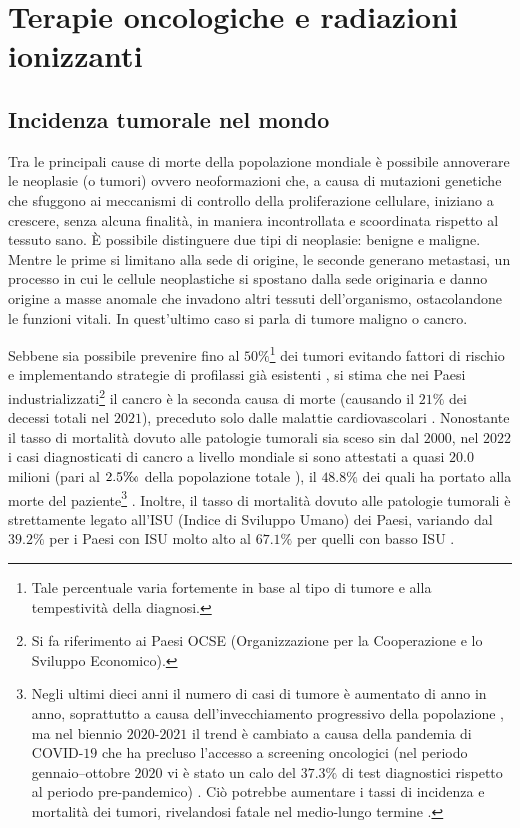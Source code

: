 \documentclass[12pt,a4paper,twoside]{report}
\begin{document}
	\chapter{Terapie oncologiche e radiazioni ionizzanti}\label{cap:1}
	\section{Incidenza tumorale nel mondo}\label{sec:1.1}
	Tra le principali cause di morte della popolazione mondiale è possibile annoverare le neoplasie (o tumori) ovvero neoformazioni che, a causa di mutazioni genetiche che sfuggono ai meccanismi di controllo della proliferazione cellulare, iniziano a crescere, senza alcuna finalità, in maniera incontrollata e scoordinata rispetto al tessuto sano. \`E possibile distinguere due tipi di neoplasie: benigne e maligne. Mentre le prime si limitano alla sede di origine, le seconde generano metastasi, un processo in cui le cellule neoplastiche si spostano dalla sede originaria e danno origine a masse anomale che invadono altri tessuti dell'organismo, ostacolandone le funzioni vitali. In quest'ultimo caso si parla di tumore maligno o cancro.
	
	Sebbene sia possibile prevenire fino al $50\%$\footnote{Tale percentuale varia fortemente in base al tipo di tumore e alla tempestività della diagnosi.} dei tumori evitando fattori di rischio e implementando strategie di profilassi già esistenti \cite{who}, si stima che nei Paesi industrializzati\footnote{Si fa riferimento ai Paesi OCSE (Organizzazione per la Cooperazione e lo Sviluppo Economico).} il cancro è la seconda causa di morte (causando il $21\%$ dei decessi totali nel $2021$), preceduto solo dalle malattie cardiovascolari \cite{oecd2023}. Nonostante il tasso di mortalità dovuto alle patologie tumorali sia sceso sin dal $2000$, nel $2022$ i casi diagnosticati di cancro a livello mondiale si sono attestati a quasi $20.0$ milioni (pari al $2.5\tcperthousand$ della popolazione totale \cite{unicef2022}), il $48.8\%$ dei quali ha portato alla morte del paziente\footnote{Negli ultimi dieci anni il numero di casi di tumore è aumentato di anno in anno, soprattutto a causa dell'invecchiamento progressivo della popolazione \cite{De_Angelis2024-no}, ma nel biennio $2020$-$2021$ il trend è cambiato a causa della pandemia di COVID-$19$ che ha precluso l'accesso a screening oncologici (nel periodo gennaio--ottobre $2020$ vi è stato un calo del $37.3\%$ di test diagnostici rispetto al periodo pre-pandemico) \cite{Angelini2023-xc}. Ciò potrebbe aumentare i tassi di incidenza e mortalità dei tumori, rivelandosi fatale nel medio-lungo termine \cite{oecd2021}.} \cite{gco}. Inoltre, il tasso di mortalità dovuto alle patologie tumorali è strettamente legato all'ISU (Indice di Sviluppo Umano) dei Paesi, variando dal $39.2\%$ per i Paesi con ISU molto alto al $67.1\%$ per quelli con basso ISU \cite{gco}.
	
\end{document}
